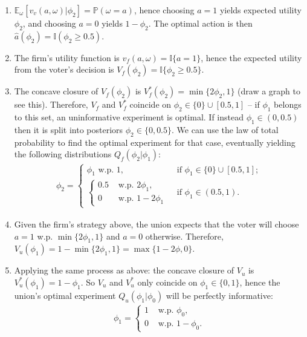 \documentclass[a4paper]{article}
\begin{document}
	\begin{enumerate}
		\item $\mathbb{E}_\omega[v_v(a,\omega)|\phi_2] = \mathbb{P}( \omega = a )$, hence choosing $a=1$ yields expected utility $\phi_2$, and choosing $a=0$ yields $1-\phi_2$. The optimal action is then $\hat{a}(\phi_2) = \mathbb{I}(\phi_2 \geq 0.5)$.
		
		\item The firm's utility function is $v_f(a,\omega) = \mathbb{I}\{a=1\}$, hence the expected utility from the voter's decision is $V_f(\phi_2) = \mathbb{I}\{\phi_2 \geq 0.5\}$.
		
		\item The concave closure of $V_f(\phi_2)$ is $V^*_f(\phi_2) = \min \{2\phi_2, 1 \}$ (draw a graph to see this). Therefore, $V_f$ and $V^*_f$ coincide on $\phi_2 \in \{0\} \cup [0.5,1]$ -- if $\phi_1$ belongs to this set, an uninformative experiment is optimal. If instead $\phi_1 \in (0,0.5)$ then it is split into posteriors $\phi_2 \in \{0,0.5\}$. We can use the law of total probability to find the optimal experiment for that case, eventually yielding the following distributions $Q_f(\phi_2|\phi_1)$:
		\begin{align*}
			\phi_2 = 
			\begin{cases}
				\phi_1 \text{ w.p. } 1, & \text{ if } \phi_1 \in \{0\} \cup [0.5,1];
				\\
				\begin{cases}
					0.5 & \text{ w.p. } 2 \phi_1,
					\\
					0 & \text{ w.p. } 1-2 \phi_1
				\end{cases}
				& \text{ if } \phi_1 \in (0.5,1).
			\end{cases}
		\end{align*}
	
		\item Given the firm's strategy above, the union expects that the voter will choose $a=1$ w.p. $\min\{2\phi_1, 1\}$ and $a=0$ otherwise. Therefore, $V_u(\phi_1) = 1 - \min\{2\phi_1, 1\} = \max \{ 1-2\phi, 0 \}$.
		
		\item Applying the same process as above: the concave closure of $V_u$ is $V^*_u(\phi_1) = 1-\phi_1$. So $V_u$ and $V^*_u$ only coincide on $\phi_1 \in \{0,1\}$, hence the union's optimal experiment $Q_u(\phi_1|\phi_0)$ will be perfectly informative:
		\begin{align*}
			\phi_1 = 
			\begin{cases}
				1 & \text{ w.p. } \phi_0,
				\\
				0 & \text{ w.p. } 1-\phi_0.
			\end{cases}
		\end{align*}
		

\end{enumerate}
\end{document}
